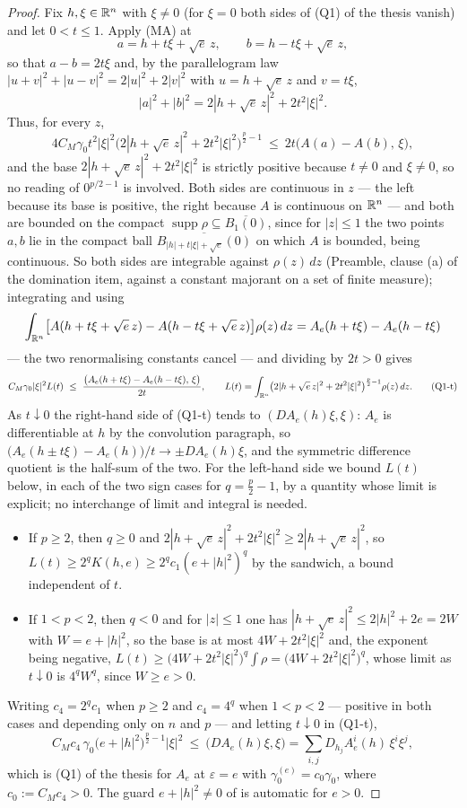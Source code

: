 \begin{proof}
Fix $h,\xi\in\mathbb{R}^n$ with $\xi\ne0$ (for $\xi=0$ both sides of (Q1) of the thesis
vanish) and let $0<t\le1$.  Apply (MA) at
\[
a=h+t\xi+\sqrt e\,z,\qquad b=h-t\xi+\sqrt e\,z ,
\]
so that $a-b=2t\xi$ and, by the parallelogram law
$|u+v|^2+|u-v|^2=2|u|^2+2|v|^2$ with $u=h+\sqrt e\,z$ and $v=t\xi$,
\[
|a|^2+|b|^2=2|h+\sqrt e\,z|^2+2t^2|\xi|^2 .
\]
Thus, for every $z$,
\[
4C_M\gamma_0t^2|\xi|^2
\bigl(2|h+\sqrt e\,z|^2+2t^2|\xi|^2\bigr)^{\frac p2-1}
\ \le\ 2t\bigl(A(a)-A(b),\,\xi\bigr),
\]
and the base $2|h+\sqrt e\,z|^2+2t^2|\xi|^2$ is strictly positive because
$t\ne0$ and $\xi\ne0$, so no reading of $0^{p/2-1}$ is involved.  Both sides are
continuous in $z$ --- the left because its base is positive, the right because
$A$ is continuous on $\mathbb{R}^n$ --- and both are bounded on the compact
$\operatorname{supp}\rho\subseteq\overline{B_1(0)}$, since for $|z|\le1$ the two
points $a,b$ lie in the compact ball
$\overline{B_{|h|+t|\xi|+\sqrt e}(0)}$ on which $A$ is bounded, being
continuous.  So both sides are integrable against $\rho(z)\,dz$ (Preamble,
clause (a) of the domination item, against a constant majorant on a set of
finite measure); integrating and using
\[
\int_{\mathbb{R}^n}\bigl[A(h+t\xi+\sqrt e\,z)-A(h-t\xi+\sqrt e\,z)\bigr]\rho(z)\,dz
=A_e(h+t\xi)-A_e(h-t\xi)
\]
--- the two renormalising constants cancel --- and dividing by $2t>0$ gives
\[
C_M\gamma_0|\xi|^2L(t)
\ \le\ \frac{\bigl(A_e(h+t\xi)-A_e(h-t\xi),\,\xi\bigr)}{2t},
\qquad
L(t)=\int_{\mathbb{R}^n}\bigl(2|h+\sqrt e\,z|^2+2t^2|\xi|^2\bigr)^{\frac p2-1}\rho(z)\,dz .
\tag{Q1-t}
\]
As $t\downarrow0$ the right-hand side of (Q1-t) tends to
$(DA_e(h)\xi,\xi)$: $A_e$ is differentiable at $h$ by the convolution paragraph,
so $\bigl(A_e(h\pm t\xi)-A_e(h)\bigr)/t\to\pm DA_e(h)\xi$, and the symmetric
difference quotient is the half-sum of the two.  For the left-hand side we
bound $L(t)$ below, in each of the two sign cases for $q=\tfrac p2-1$, by a
quantity whose limit is explicit; no interchange of limit and integral is
needed.
\begin{itemize}
\item If $p\ge2$, then $q\ge0$ and
  $2|h+\sqrt e\,z|^2+2t^2|\xi|^2\ge2|h+\sqrt e\,z|^2$, so
  $L(t)\ge2^qK(h,e)\ge2^qc_1(e+|h|^2)^q$ by the sandwich, a bound independent
  of $t$.
\item If $1<p<2$, then $q<0$ and for $|z|\le1$ one has
  $|h+\sqrt e\,z|^2\le2|h|^2+2e=2W$ with $W=e+|h|^2$, so the base is at most
  $4W+2t^2|\xi|^2$ and, the exponent being negative,
  $L(t)\ge\bigl(4W+2t^2|\xi|^2\bigr)^q\int\rho=\bigl(4W+2t^2|\xi|^2\bigr)^q$,
  whose limit as $t\downarrow0$ is $4^qW^q$, since $W\ge e>0$.
\end{itemize}
Writing $c_4=2^qc_1$ when $p\ge2$ and $c_4=4^q$ when $1<p<2$ --- positive in
both cases and depending only on $n$ and $p$ --- and letting $t\downarrow0$ in
(Q1-t),
\[
C_M c_4\,\gamma_0\bigl(e+|h|^2\bigr)^{\frac p2-1}|\xi|^2
\ \le\ \bigl(DA_e(h)\xi,\xi\bigr)
=\sum_{i,j}D_{h_j}A_e^i(h)\,\xi^i\xi^j ,
\]
which is (Q1) of the thesis for $A_e$ at $\varepsilon=e$ with
$\gamma_0^{(e)}=c_0\gamma_0$, where $c_0:=C_Mc_4>0$.  The guard
$e+|h|^2\ne0$ of  is automatic for $e>0$.


\end{proof}

